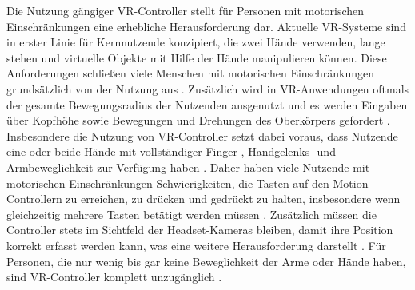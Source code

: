 Die Nutzung gängiger VR-Controller stellt für Personen mit motorischen Einschränkungen eine erhebliche Herausforderung dar. Aktuelle VR-Systeme sind in erster Linie für Kernnutzende konzipiert, die zwei Hände verwenden, lange stehen und virtuelle Objekte mit Hilfe der Hände manipulieren können. Diese Anforderungen schließen viele Menschen mit motorischen Einschränkungen grundsätzlich von der Nutzung aus \citep{dombrowski_designing_2019}. Zusätzlich wird in VR-Anwendungen oftmals der gesamte Bewegungsradius der Nutzenden ausgenutzt und es werden Eingaben über Kopfhöhe sowie Bewegungen und Drehungen des Oberkörpers gefordert \citep{gerling_critical_2021}. Insbesondere die Nutzung von VR-Controller setzt dabei voraus, dass Nutzende eine oder beide Hände mit vollständiger Finger-, Handgelenks- und Armbeweglichkeit zur Verfügung haben \citep{mott_accessible_2019}. Daher haben viele Nutzende mit motorischen Einschränkungen Schwierigkeiten, die Tasten auf den Motion-Controllern zu erreichen, zu drücken und gedrückt zu halten, insbesondere wenn gleichzeitig mehrere Tasten betätigt werden müssen \citep{mott_i_2020}. Zusätzlich müssen die Controller stets im Sichtfeld der Headset-Kameras bleiben, damit ihre Position korrekt erfasst werden kann, was eine weitere Herausforderung darstellt \citep{mott_i_2020}. Für Personen, die nur wenig bis gar keine Beweglichkeit der Arme oder Hände haben, sind VR-Controller komplett unzugänglich \citep{mott_i_2020}.



